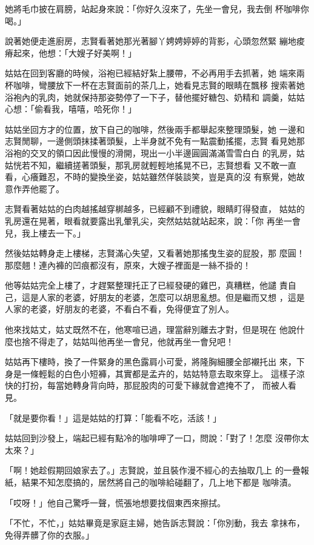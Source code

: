 她將毛巾披在肩膀，站起身來說：「你好久沒來了，先坐一會兒，我去倒
杯咖啡你喝。」

說著她便走進廚房，志賢看著她那光著腳丫娉娉婷婷的背影，心頭忽然緊
繃地痠瘠起來，他想：「大嫂子好美啊！」

姑姑在回到客廳的時候，浴袍已經結好紮上腰帶，不必再用手去抓著，她
端來兩杯咖啡，彎腰放下一杯在志賢面前的茶几上，她看見志賢的眼睛在飄移
搜索著她浴袍內的乳肉，她就保持那姿勢停了一下子，替他擺好糖包、奶精和
調羹，姑姑心想：「偷看我，嘻嘻，哈死你！」

姑姑坐回方才的位置，放下自己的咖啡，然後兩手都舉起來整理頭髮，她
一邊和志賢閒聊，一邊側頭抹揉著頭髮，上半身就不免有一點震動搖擺，志賢
看見她那浴袍的交叉的領口因此慢慢的滑開，現出一小半邊圓圓滿滿雪雪白白
的乳房，姑姑恍若不知，繼續搓著頭髮，那乳房就輕輕地搖晃不已，志賢想看
又不敢一直看，心癢難忍，不時的變換坐姿，姑姑雖然佯裝談笑，豈是真的沒
有察覺，她故意作弄他罷了。

志賢看著姑姑的白肉越搖越穿梆越多，已經顧不到禮貌，眼睛盯得發直，
姑姑的乳房還在晃著，眼看就要露出乳暈乳尖，突然姑姑就站起來，說：「你
再坐一會兒，我上樓去一下。」

然後姑姑轉身走上樓梯，志賢滿心失望，又看著她那搖曳生姿的屁股，那
麼圓！那麼翹！連內褲的凹痕都沒有，原來，大嫂子裡面是一絲不掛的！

他等姑姑完全上樓了，才趕緊整理托正了已經發硬的雞巴，真糟糕，他譴
責自己，這是人家的老婆，好朋友的老婆，怎麼可以胡思亂想。但是繼而又想
，這是人家的老婆，好朋友的老婆，不看白不看，免得便宜了別人。

他來找姑丈，姑丈既然不在，他寒喧已過，理當辭別離去才對，但是現在
他說什麼也捨不得走了，姑姑叫他再坐一會兒，他就再坐一會兒吧！

姑姑再下樓時，換了一件緊身的黑色露肩小可愛，將隆胸細腰全部襯托出
來，下身是一條輕鬆的白色小短褲，其實都是孟卉的，姑姑特意去取來穿上。
這樣子涼快的打扮，每當她轉身背向時，那屁股肉的可愛下緣就會遮掩不了，
而被人看見。

「就是要你看！」這是姑姑的打算：「能看不吃，活該！」

姑姑回到沙發上，端起已經有點冷的咖啡呷了一口，問說：「對了！怎麼
沒帶你太太來？」

「啊！她趁假期回娘家去了。」志賢說，並且裝作漫不經心的去抽取几上
的一疊報紙，結果不知怎麼搞的，居然將自己的咖啡給碰翻了，几上地下都是
咖啡漬。

「哎呀！」他自己驚呼一聲，慌張地想要找個東西來擦拭。

「不忙，不忙，」姑姑畢竟是家庭主婦，她告訴志賢說：「你別動，我去
拿抹布，免得弄髒了你的衣服。」

